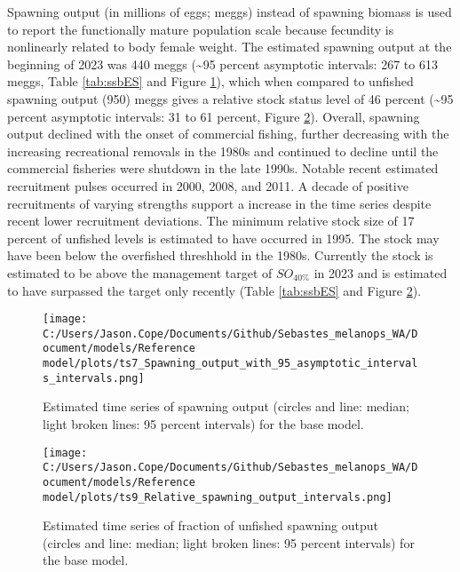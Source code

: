\documentclass[11pt,
  english,
  letterpaper,
]{article}
\begin{document}
Spawning output (in millions of eggs; meggs) instead of spawning biomass is used to report the functionally mature population scale because fecundity is nonlinearly related to body female weight. The estimated spawning output at the beginning of 2023 was 440 meggs (\textasciitilde95 percent asymptotic intervals: 267 to 613 meggs, Table \ref{tab:ssbES} and Figure \ref{fig:es-ssb}), which when compared to unfished spawning output (950) meggs gives a relative stock status level of 46 percent (\textasciitilde95 percent asymptotic intervals: 31 to 61 percent, Figure \ref{fig:es-depl}). Overall, spawning output declined with the onset of commercial fishing, further decreasing with the increasing recreational removals in the 1980s and continued to decline until the commercial fisheries were shutdown in the late 1990s. Notable recent estimated recruitment pulses occurred in 2000, 2008, and 2011. A decade of positive recruitments of varying strengths support a increase in the time series despite recent lower recruitment deviations. The minimum relative stock size of 17 percent of unfished levels is estimated to have occurred in 1995. The stock may have been below the overfished threshhold in the 1980s. Currently the stock is estimated to be above the management target of \(SO_{40\%}\) in 2023 and is estimated to have surpassed the target only recently (Table \ref{tab:ssbES} and Figure \ref{fig:es-depl}).



\begin{figure}
\centering
\texttt{[image: C:/Users/Jason.Cope/Documents/Github/Sebastes\_melanops\_WA/Document/models/Reference model/plots/ts7\_Spawning\_output\_with\_95\_asymptotic\_intervals\_intervals.png]}
\caption{Estimated time series of spawning output (circles and line: median; light broken lines: 95 percent intervals) for the base model.\label{fig:es-ssb}}
\end{figure}

\begin{figure}
\centering
\texttt{[image: C:/Users/Jason.Cope/Documents/Github/Sebastes\_melanops\_WA/Document/models/Reference model/plots/ts9\_Relative\_spawning\_output\_intervals.png]}
\caption{Estimated time series of fraction of unfished spawning output (circles and line: median; light broken lines: 95 percent intervals) for the base model.\label{fig:es-depl}}
\end{figure}
\end{document}
